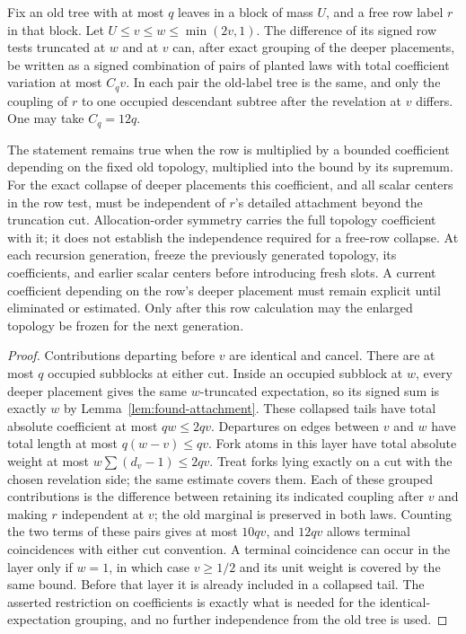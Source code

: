 \begin{lemma}\label{lem:found-cut-truncation}
Fix an old tree with at most $q$ leaves in a block of mass $U$, and a
free row label $r$ in that block. Let $U\leq v\leq w\leq\min(2v,1)$.
The difference of its signed row tests truncated at $w$ and at $v$ can,
after exact grouping of the deeper placements, be written as a signed
combination of pairs of planted laws with total coefficient variation
at most $C_qv$. In each pair the old-label tree is the same, and only
the coupling of $r$ to one occupied descendant subtree after the
revelation at $v$ differs. One may take $C_q=12q$.

The statement remains true when the row is multiplied by a bounded
coefficient depending on the fixed old topology, multiplied into the
bound by its supremum. For the exact collapse of deeper placements this
coefficient, and all scalar centers in the row test, must be independent
of $r$'s detailed attachment beyond the truncation cut.
Allocation-order symmetry carries the full topology coefficient with it;
it does not establish the independence required for a free-row collapse.
At each recursion generation, freeze the previously generated topology,
its coefficients, and earlier scalar centers before introducing fresh
slots. A current coefficient depending on the row's deeper placement
must remain explicit until eliminated or estimated. Only after this
row calculation may the enlarged topology be frozen for the next
generation.
\end{lemma}

\begin{proof}
Contributions departing before $v$ are identical and cancel. There are
at most $q$ occupied subblocks at either cut. Inside an occupied subblock
at $w$, every deeper placement gives the same $w$-truncated expectation,
so its signed sum is exactly $w$ by
Lemma~\ref{lem:found-attachment}. These collapsed tails have total
absolute coefficient at most $qw\leq2qv$. Departures on edges between
$v$ and $w$ have total length at most $q(w-v)\leq qv$. Fork atoms in
this layer have total absolute weight at most
$w\sum(d_v-1)\leq2qv$. Treat forks lying exactly on a cut with the
chosen revelation side; the same estimate covers them. Each of these
grouped contributions is the difference between retaining its indicated
coupling after $v$ and making $r$ independent at $v$; the old marginal
is preserved in both laws. Counting the two terms of these pairs gives
at most $10qv$, and $12qv$ allows terminal coincidences with either cut
convention. A terminal coincidence can occur in the layer only if
$w=1$, in which case $v\geq1/2$ and its unit weight is covered by the
same bound. Before that layer it is already included in a collapsed
tail. The asserted restriction on coefficients is exactly what is
needed for the identical-expectation grouping, and no further
independence from the old tree is used.
\end{proof}

